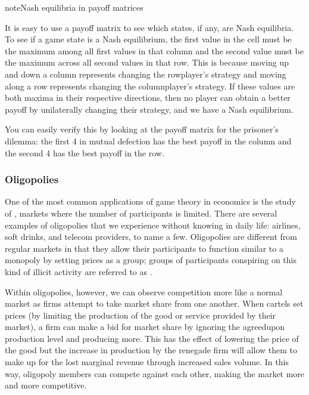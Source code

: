 \documentclass[letterpaper,10pt,english]{jupyterBook}
\begin{document}
\begin{sphinxadmonition}{note}{Nash equilibria in payoff matrices}

\sphinxAtStartPar
It is easy to use a payoff matrix to  see which  states, if any, are Nash equilibria. To see if a game state is a Nash equilibrium, the first value in the cell must be the maximum among all first values in that column and the second value must be the maximum across all second values in that row. This is because moving up and down a column represents changing the row\sphinxhyphen{}player’s strategy and  moving along a row represents changing the column\sphinxhyphen{}player’s strategy. If these values are both maxima in their respective directions, then no player can obtain a better payoff by unilaterally changing their strategy, and we have a Nash equilibrium.

\sphinxAtStartPar
You can easily verify this by looking at the payoff matrix for the prisoner’s dilemma: the  first 4 in mutual defection has the best payoff in the column and the second  4 has the best payoff in the row.
\end{sphinxadmonition}


\subsubsection{Oligopolies}
\label{\detokenize{content/07-game-theory/equilibria-oligopolies:oligopolies}}
\sphinxAtStartPar
One of the most common applications of game theory in economics is the study of , markets where the number of participants is limited. There are several examples of oligopolies that we experience without knowing in daily life: airlines, soft drinks, and telecom providers, to name a few. Oligopolies are different from regular markets in that they allow their participants to function similar to a monopoly by setting prices as a group; groups of participants conspiring on this kind of illicit activity are referred to as .

\sphinxAtStartPar
Within oligopolies, however, we can observe competition more like a normal market as firms attempt to take market share from one another. When cartels set prices (by limiting the production of the good or service provided by their market), a firm can make a bid for market share by ignoring the agreed\sphinxhyphen{}upon production level and producing more. This has the effect of lowering the price of the good but the increase in production by the renegade firm will allow them to make up for the lost marginal revenue through increased sales volume. In this way, oligopoly members can compete against each other, making the market more and more competitive.
\end{document}
